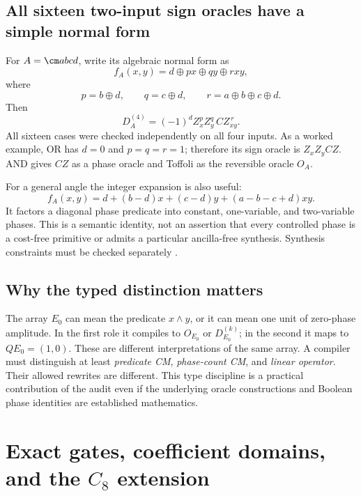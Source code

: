 \subsection{All sixteen two-input sign oracles have a simple normal form}
For $A=\cm abcd$, write its algebraic normal form as
\begin{equation}
 f_A(x,y)=d\oplus p x\oplus q y\oplus rxy,
\end{equation}
where
\begin{equation}
 p=b\oplus d,\qquad q=c\oplus d,\qquad r=a\oplus b\oplus c\oplus d.
\end{equation}
Then
\begin{equation}\label{eq:ANForacle}
 D_A^{(4)}=(-1)^d Z_x^p Z_y^q\,CZ_{xy}^{\,r}.
\end{equation}
All sixteen cases were checked independently on all four inputs. As a worked example, OR has $d=0$ and $p=q=r=1$; therefore its sign oracle is $Z_xZ_yCZ$. AND gives $CZ$ as a phase oracle and Toffoli as the reversible oracle $O_A$.

For a general angle the integer expansion is also useful:
\begin{equation}
 f_A(x,y)=d+(b-d)x+(c-d)y+(a-b-c+d)xy.
\end{equation}
It factors a diagonal phase predicate into constant, one-variable, and two-variable phases. This is a semantic identity, not an assertion that every controlled phase is a cost-free primitive or admits a particular ancilla-free synthesis. Synthesis constraints must be checked separately \cite{giles,kmm}.

\subsection{Why the typed distinction matters}
The array $E_0$ can mean the predicate $x\land y$, or it can mean one unit of zero-phase amplitude. In the first role it compiles to $O_{E_0}$ or $D_{E_0}^{(k)}$; in the second it maps to $QE_0=(1,0)$. These are different interpretations of the same array. A compiler must distinguish at least \emph{predicate CM}, \emph{phase-count CM}, and \emph{linear operator}. Their allowed rewrites are different. This type discipline is a practical contribution of the audit even if the underlying oracle constructions and Boolean phase identities are established mathematics.

\section{Exact gates, coefficient domains, and the \texorpdfstring{$C_8$}{C8} extension}\label{sec:exact}
